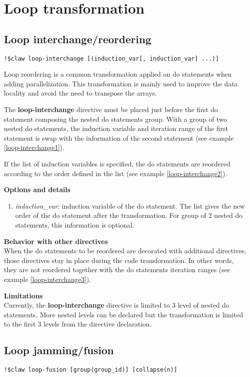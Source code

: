 \section{Loop transformation}
\subsection{Loop interchange/reordering}
\begin{lstlisting}
!$claw loop-interchange [(induction_var[, induction_var] ...)]
\end{lstlisting}

Loop reordering is a common transformation applied on do statements when adding parallelization. This transformation is mainly used to improve the data locality and avoid the need to transpose the arrays.

The \textbf{loop-interchange} directive must be placed just before the first do statement composing the nested do statements group. With a group of two nested do statements, the induction variable and iteration range of the first statement is swap with the information of the second statement (see example \ref{loop-interchange1}). 

If the list of induction variables is specified, the do statements are reordered according to the order defined in the list (see example \ref{loop-interchange2}).

\textbf{Options and details}
\begin{enumerate}
\item \textit{induction\_var}: induction variable of the do statement. The list gives the new order of the do statement after the transformation. For group of 2 nested do statements, this information is optional. 
\end{enumerate}


\textbf{Behavior with other directives}\\
When the do statements to be reordered are decorated with additional directives, those directives stay in place during the code transformation. In other words, they are not reordered together with the do statements iteration ranges (see example \ref{loop-interchange3}).

\textbf{Limitations}\\
Currently, the \textbf{loop-interchange} directive is limited to 3 level of nested do statements. More nested levels can be declared but the transformation is limited to the first 3 levels from the directive declaration.

\subsection{Loop jamming/fusion}
\begin{lstlisting}
!$claw loop-fusion [group(group_id)] [collapse(n)]
\end{lstlisting}

